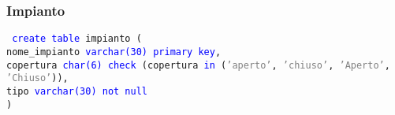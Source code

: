 \documentclass{article}
\begin{document}
    \subsubsection{Impianto}
    \begin{flushleft}
        \texttt{
        \textcolor{blue}{create table} impianto ( \\
        \hspace*{2em} nome\_impianto \hspace*{1.8em} \textcolor{blue}{varchar(30)} \hspace*{4em} \textcolor{blue}{primary key}, \\
        \hspace*{2em} copertura \hspace*{3.6em} \textcolor{blue}{char(6)} \hspace*{6em} \textcolor{blue}{check} (copertura \textcolor{blue}{in} (\textcolor{gray}{'aperto'}, \hspace*{21.7em} \textcolor{gray}{'chiuso'}, \textcolor{gray}{'Aperto'}, \textcolor{gray}{'Chiuso'})), \\
        \hspace*{2em} tipo \hspace*{6.2em} \textcolor{blue}{varchar(30)} \hspace*{4.1em} \textcolor{blue}{not null} \\)}
    \end{flushleft}
\end{document}

